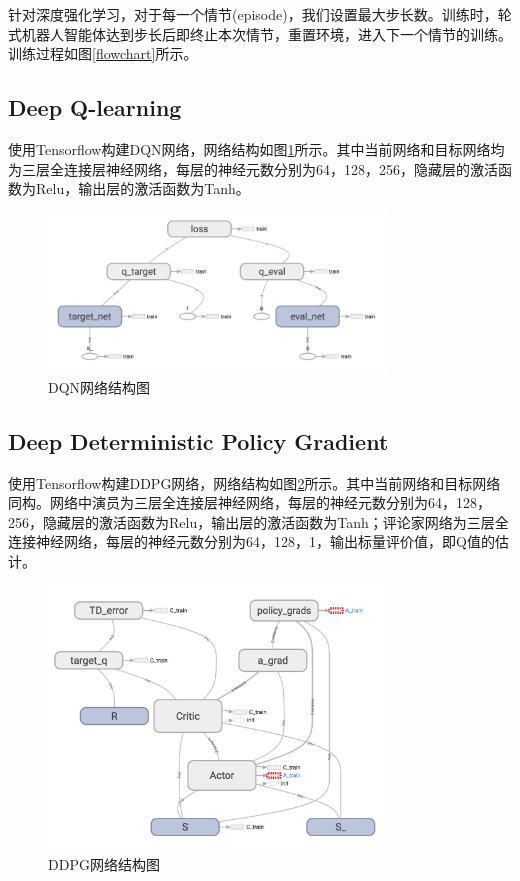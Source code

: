 针对深度强化学习，对于每一个情节(episode)，我们设置最大步长数。训练时，轮式机器人智能体达到步长后即终止本次情节，重置环境，进入下一个情节的训练。训练过程如图\ref{flowchart}所示。

\subsection{Deep Q-learning}
使用Tensorflow构建DQN网络，网络结构如图\ref{dqnnet}所示。其中当前网络和目标网络均为三层全连接层神经网络，每层的神经元数分别为64，128，256，隐藏层的激活函数为Relu，输出层的激活函数为Tanh。
\begin{figure}[b]
  \centering
  \includegraphics[width=0.80\textwidth]{figures/dqnnet.png}
  \caption{DQN网络结构图}\label{dqnnet}
\end{figure}

\subsection{Deep Deterministic Policy Gradient}
使用Tensorflow构建DDPG网络，网络结构如图\ref{ddpgnet}所示。其中当前网络和目标网络同构。网络中演员为三层全连接层神经网络，每层的神经元数分别为64，128，256，隐藏层的激活函数为Relu，输出层的激活函数为Tanh；评论家网络为三层全连接神经网络，每层的神经元数分别为64，128，1，输出标量评价值，即Q值的估计。
\begin{figure}[ht]
  \centering
  \includegraphics[width=0.80\textwidth]{figures/ddpgnet.png}
  \caption{DDPG网络结构图}\label{ddpgnet}
\end{figure}

